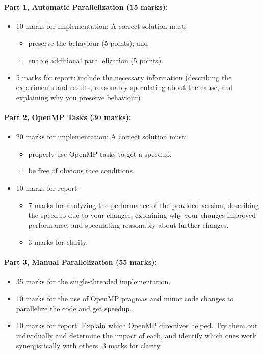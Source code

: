 \documentclass[letterpaper,10pt]{article}
\begin{document}
\paragraph{Part 1, Automatic Parallelization (15 marks):}  
\begin{itemize}
\item 10 marks for implementation: A correct solution must:
\begin{itemize}
	\item preserve the behaviour (5 points); and
	\item enable additional parallelization (5 points).
\end{itemize}
 
\item 5 marks for report: include the necessary information
(describing the experiments and results, reasonably speculating about
the cause, and explaining why you preserve behaviour)
\end{itemize}

\paragraph{Part 2, OpenMP Tasks (30 marks):} 

\begin{itemize}
\item 20 marks for implementation: A correct solution must:
\begin{itemize}
	\item properly use OpenMP tasks to get a speedup;
	\item be free of obvious race conditions.
\end{itemize}
\item 10 marks for report: 
\begin{itemize}
\item 7 marks for analyzing the performance
of the provided version, describing the speedup due to your
changes, explaining why your changes improved performance, and
speculating reasonably about further changes. 
\item 3 marks for clarity.
\end{itemize}
\end{itemize}

\paragraph{Part 3, Manual Parallelization (55 marks):} 
\begin{itemize}
\item 35 marks for the single-threaded implementation. 

\item 10 marks for the use of OpenMP pragmas and minor code changes to parallelize the code and get speedup.

\item 10 marks for report: Explain which OpenMP directives helped. Try them out individually and determine the impact of each, and identify which ones work synergistically with others. 3 marks for clarity.
\end{itemize}
\end{document}
